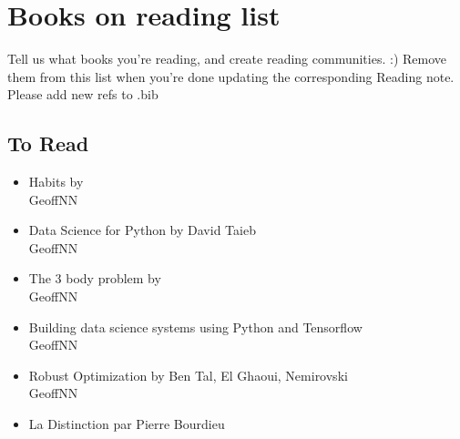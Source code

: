 
\section{Books on reading list}
Tell us what books you're reading, and create reading communities. :) Remove them from this list when you're done updating the corresponding Reading note. Please add new refs to .bib

\subsection{To Read}
\begin{itemize}
    \item Habits by \\
    GeoffNN
    \item Data Science for Python by David Taieb \\
    GeoffNN
    \item The 3 body problem by \\
    GeoffNN
    \item Building data science systems using Python and Tensorflow \\
    GeoffNN
    \item Robust Optimization by Ben Tal, El Ghaoui, Nemirovski \\
    GeoffNN
    \item La Distinction par Pierre Bourdieu \\
\end{itemize}

